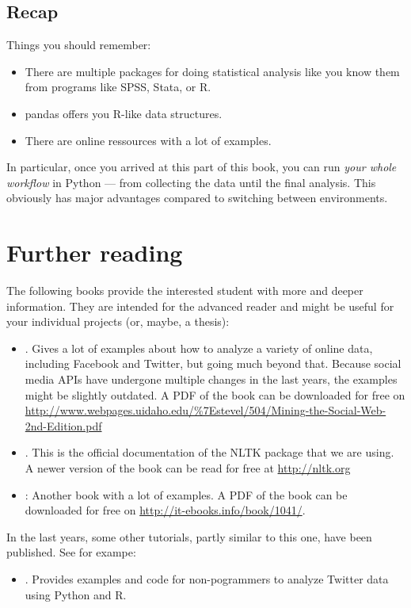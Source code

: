\documentclass[a4paper,12pt]{book}
\begin{document}
\section{Recap}
Things you should remember:
\begin{itemize}
	\item There are multiple packages for doing statistical analysis like you know them from programs like SPSS, Stata, or R.
	\item pandas offers you R-like data structures.
	\item There are online ressources with a lot of examples.
\end{itemize}
In particular, once you arrived at this part of this book, you can run \emph{your whole workflow} in Python --- from collecting the data until the final analysis. This obviously has major advantages compared to switching between environments.


\chapter{Further reading}
The following books provide the interested student with more and deeper information. They are intended for the advanced reader and might be useful for your individual projects (or, maybe, a thesis):

\begin{itemize}
\item \citealp{Russel2013}. Gives a lot of examples about how to analyze a variety of online data, including Facebook and Twitter, but going much beyond that. Because social media APIs have undergone multiple changes in the last years, the examples might be slightly outdated. A PDF of the book can be downloaded for free on \url{http://www.webpages.uidaho.edu/\%7Estevel/504/Mining-the-Social-Web-2nd-Edition.pdf}
\item \citealp{Bird2009}. This is the official documentation of the NLTK package that we are using. A newer version of the book can be read for free at \url{http://nltk.org}
\item \citealp{McKinney2012}: Another book with a lot of examples. A PDF of the book can be downloaded for free on \url{http://it-ebooks.info/book/1041/}.
\end{itemize}

In the last years, some other tutorials, partly similar to this one, have been published. See for exampe:
\begin{itemize}
\item \citealp{Jurgens2016}. Provides examples and code for non-pogrammers to analyze Twitter data using Python and R.
\end{itemize}
\end{document}
